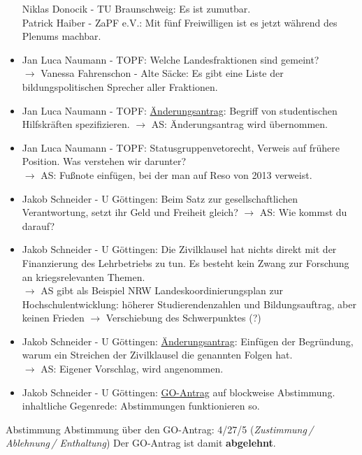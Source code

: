 \begin{itemize}
        Niklas Donocik - TU Braunschweig:  Es ist zumutbar. \\
        Patrick Haiber - ZaPF e.V.:  Mit fünf Freiwilligen ist es jetzt während des Plenums machbar.
      \item Jan Luca Naumann - TOPF:  Welche Landesfraktionen sind gemeint? \\
        $\rightarrow$ Vanessa Fahrenschon - Alte Säcke:  Es gibt eine Liste der bildungspolitischen Sprecher aller Fraktionen.
      \item Jan Luca Naumann - TOPF:  \uline{Änderungsantrag}: Begriff von studentischen Hilfskräften spezifizieren.
        $\rightarrow$ AS: Änderungsantrag wird übernommen.
      \item Jan Luca Naumann - TOPF:  Statusgruppenvetorecht, Verweis auf frühere Position. Was verstehen wir darunter? \\
        $\rightarrow$ AS: Fußnote einfügen, bei der man auf Reso von 2013 verweist.
      \item Jakob Schneider - U Göttingen:  Beim Satz zur gesellschaftlichen Verantwortung, setzt ihr Geld und Freiheit gleich?
        $\rightarrow$ AS: Wie kommst du darauf?
      \item Jakob Schneider - U Göttingen:  Die Zivilklausel hat nichts direkt mit der Finanzierung des Lehrbetriebs zu tun. Es besteht kein Zwang zur Forschung an kriegsrelevanten Themen. \\
        $\rightarrow$ AS gibt als Beispiel NRW Landeskoordinierungsplan zur Hochschulentwicklung: höherer Studierendenzahlen und Bildungsauftrag, aber keinen Frieden $\rightarrow$ Verschiebung des Schwerpunktes (?)
      \item Jakob Schneider - U Göttingen:  \uline{Änderungsantrag}: Einfügen der Begründung, warum ein Streichen der Zivilklausel die genannten Folgen hat. \\
        $\rightarrow$ AS: Eigener Vorschlag, wird angenommen.
      \item Jakob Schneider - U Göttingen:  \uline{GO-Antrag} auf blockweise Abstimmung. \\
        inhaltliche Gegenrede: Abstimmungen funktionieren so.
    \end{itemize}

    \begin{danger}{Abstimmung}
      Abstimmung über den GO-Antrag: 4/27/5 (\textit{Zustimmung\,/ Ablehnung\,/ Enthaltung})
      Der GO-Antrag ist damit \textbf{abgelehnt}.
    \end{danger}

